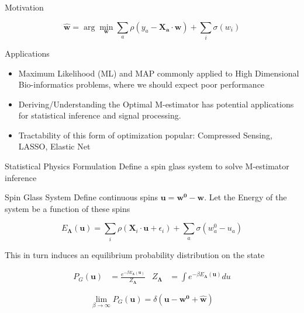 \documentclass[pdf]{beamer}
\begin{document}
\begin{frame}{Motivation}

\begin{equation*}
            \mathbf{\hat{w}} = \arg\min_\mathbf{w} {\sum_a{\rho(y_a - \mathbf{X_a} \cdot\mathbf{ w})} + \sum_i{\sigma(w_i)}}
\end{equation*}
\vspace{.1in}

\begin{block}{Applications}
\begin{itemize}
\vspace{.1in}
 \item{Maximum Likelihood (ML) and MAP commonly applied to High Dimensional Bio-informatics problems, where we should expect poor performance}
     \vspace{.1in}
 \item{Deriving/Understanding the Optimal M-estimator has potential applications for statistical inference and signal processing.}
     \vspace{.1in}
 \item{ Tractability of this form of optimization popular: Compressed Sensing, LASSO, Elastic Net}
\end{itemize}
\end{block}



\end{frame}


\begin{frame}[t]{Statistical Physics Formulation}
Define a spin glass system to solve M-estimator inference

\begin{block}{Spin Glass System}
Define continuous spins $\mathbf{u}=\mathbf{w^0}-\mathbf{w}$. Let the Energy of the system be a function of these spins

\begin{equation*}
 E_{\boldsymbol{\Lambda}}(\mathbf{u})=\sum_i{\rho\left(\mathbf{X}_{i}\cdot \mathbf{u} +\epsilon_i\right)}+\sum_a{\sigma(w^0_a-u_a)}
\end{equation*}

This in turn induces an equilibrium probability distribution on the state

\begin{align*}
P_{G}(\mathbf{u}) &= \frac{e^{-\beta E_{\boldsymbol{\Lambda}}(\mathbf{u})}}{Z_{\boldsymbol{\Lambda}}} & Z_{\boldsymbol{\Lambda}} &= \int{e^{-\beta E_{\boldsymbol{\Lambda}} (\mathbf{u}) }du}
\end{align*}

\begin{equation*}
\lim_{\beta \rightarrow \infty} P_{G}(\mathbf{u}) = \delta\left(\mathbf{u} - \mathbf{w^0} +\mathbf{\hat{w}}\right)
\end{equation*}

\end{block}


\end{frame}
\end{document}
